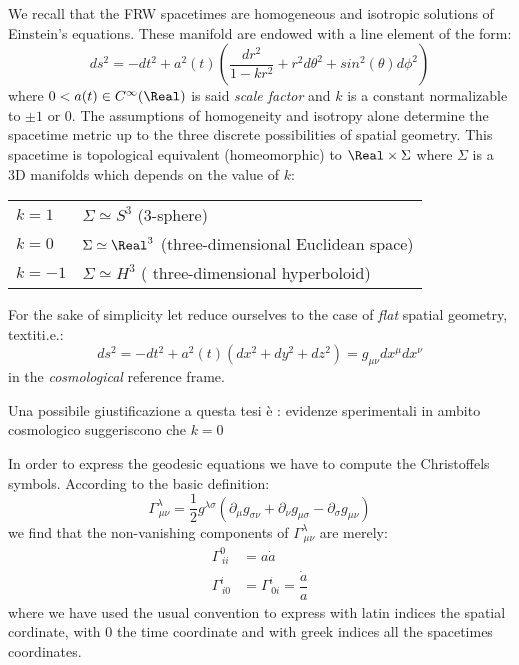 \documentclass[Main]{subfiles}
\begin{document}
	We recall that the FRW spacetimes are homogeneous and isotropic solutions of Einstein’s equations.
	These manifold are endowed with a line element of the form:
	\begin{equation}
		ds^2 = -dt^2 + a^2(t) \left( \frac{dr^2}{1-k r^2} + r^2 d\theta^2 + sin^2(\theta) d\phi^2\right)
	\end{equation}
		where $0 < a(t) \in C^\infty	(\Real)$ is said \emph{scale factor} and $k$ is a constant normalizable to $\pm 1$ or $0$.
		The assumptions of homogeneity and isotropy alone determine the spacetime metric up to the three discrete possibilities of spatial geometry.
		This spacetime is topological equivalent (homeomorphic) to $\Real \times \Sigma$ where $\Sigma$ is a 3D manifolds which depends on the value of $k$:
		\begin{center}\begin{tabular}{l l}
			$k = 1$ & $\Sigma \simeq S^3$ (3-sphere)\\
			$k = 0$ & $\Sigma \simeq \Real^3$ (three-dimensional Euclidean space)\\
			$k = -1$ & $\Sigma \simeq H^3$ ( three-dimensional hyperboloid)\\		
		\end{tabular}\end{center}
		\vspace{2mm}
		
		For the sake of simplicity let reduce ourselves to the case of \emph{flat} spatial geometry, \\textit{i.e.}:
		\begin{displaymath}
			ds^2 = -dt^2 + a^2(t) \left( dx^2 + dy^2 + dz^2\right) = g_{\mu \nu} dx^\mu dx^\nu
		\end{displaymath}
		in the \emph{cosmological} reference frame.
\ifToninus
	\begin{Warning}
		Una possibile giustificazione a questa tesi è : evidenze sperimentali in ambito cosmologico suggeriscono che $k=0$
	\end{Warning}
\fi


		In order to express the geodesic equations we have to compute the Christoffels symbols. According to the basic definition:
		\begin{displaymath}
			\Gamma^\lambda_{\, \mu \nu} = \frac{1}{2} g^{\lambda \sigma } \left( \partial_\mu g_{\sigma \nu} + \partial_\nu g_{\mu \sigma} - \partial_{\sigma}g_{\mu \nu} \right)
		\end{displaymath}
		we find that the non-vanishing components of $\Gamma^\lambda_{\, \mu \nu}$ are merely:
			\begin{eqnarray}
				\Gamma^0_{\, i i} &= a \dot{a} \\
				\Gamma^i_{\, i 0} &= \Gamma^i_{\, 0 i} = \dfrac{\dot{a}}{a}
			\end{eqnarray}
			where we have used the usual convention to express with latin indices the spatial cordinate, with $0$ the time coordinate and with greek indices all the spacetimes coordinates.
			
\end{document}
